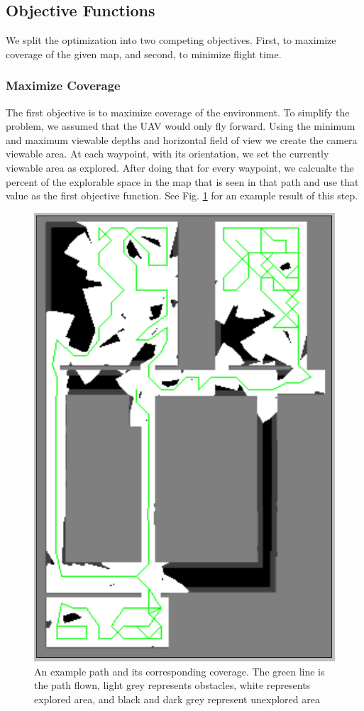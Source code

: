 \documentclass[letterpaper, 10 pt, conference]{ieeeconf}  %
\begin{document}
\subsection{Objective Functions}

We split the optimization into two competing objectives. First, to maximize coverage of the given map, and second, to minimize flight time.

\subsubsection{Maximize Coverage}

The first objective is to maximize coverage of the environment.  To simplify the problem, we assumed that the UAV would only fly forward. Using the minimum and maximum viewable depths and horizontal field of view  we create the camera viewable area. At each waypoint, with its orientation, we set the currently viewable area as explored. After doing that for every waypoint, we calcualte the percent of the explorable space in the map that is seen in that path and use that value as the first objective function. See Fig. \ref{fig:coverage} for an example result of this step.

\begin{figure}
\centering
\includegraphics[width=0.8\linewidth]{figures/coverage_map2.png}
\caption{An example path and its corresponding coverage. The green line is the path flown, light grey represents obstacles, white represents explored area, and black and dark grey represent unexplored area}
\label{fig:coverage}
\end{figure}
\end{document}
